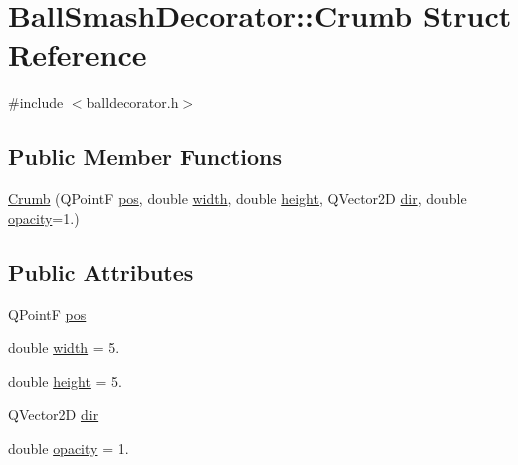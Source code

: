 \hypertarget{struct_ball_smash_decorator_1_1_crumb}{}\section{Ball\+Smash\+Decorator\+:\+:Crumb Struct Reference}
\label{struct_ball_smash_decorator_1_1_crumb}


{\ttfamily \#include $<$balldecorator.\+h$>$}

\subsection*{Public Member Functions}
\begin{DoxyCompactItemize}
\item 
\mbox{\hyperlink{struct_ball_smash_decorator_1_1_crumb_a56aecb399208100c5949fd769841c471}{Crumb}} (Q\+PointF \mbox{\hyperlink{struct_ball_smash_decorator_1_1_crumb_a227020594ba8919c73e6d99b81295015}{pos}}, double \mbox{\hyperlink{struct_ball_smash_decorator_1_1_crumb_a819ee5d8334f427a3e88d50dd020ff41}{width}}, double \mbox{\hyperlink{struct_ball_smash_decorator_1_1_crumb_a127266575a109f1074ef8d007abcf97d}{height}}, Q\+Vector2D \mbox{\hyperlink{struct_ball_smash_decorator_1_1_crumb_aae0338b32f39f2afafdc80796591fe24}{dir}}, double \mbox{\hyperlink{struct_ball_smash_decorator_1_1_crumb_a7d3c5a6ae93d33b50fc6209e2573ac80}{opacity}}=1.)
\end{DoxyCompactItemize}
\subsection*{Public Attributes}
\begin{DoxyCompactItemize}
\item 
Q\+PointF \mbox{\hyperlink{struct_ball_smash_decorator_1_1_crumb_a227020594ba8919c73e6d99b81295015}{pos}}
\item 
double \mbox{\hyperlink{struct_ball_smash_decorator_1_1_crumb_a819ee5d8334f427a3e88d50dd020ff41}{width}} = 5.
\item 
double \mbox{\hyperlink{struct_ball_smash_decorator_1_1_crumb_a127266575a109f1074ef8d007abcf97d}{height}} = 5.
\item 
Q\+Vector2D \mbox{\hyperlink{struct_ball_smash_decorator_1_1_crumb_aae0338b32f39f2afafdc80796591fe24}{dir}}
\item 
double \mbox{\hyperlink{struct_ball_smash_decorator_1_1_crumb_a7d3c5a6ae93d33b50fc6209e2573ac80}{opacity}} = 1.
\end{DoxyCompactItemize}


